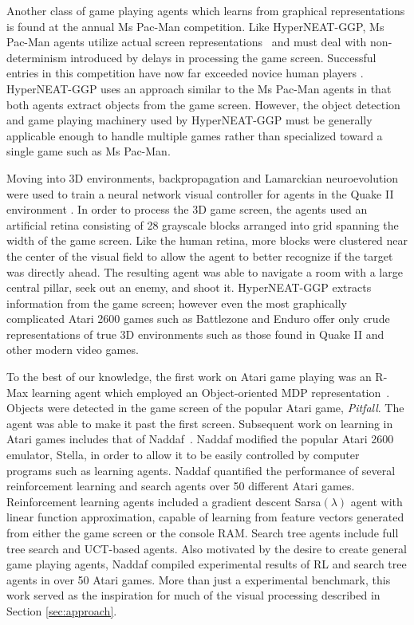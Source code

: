 \documentclass{sig-alternate}
\begin{document}
Another class of game playing agents which learns from graphical representations is found at the annual Ms Pac-Man competition. Like HyperNEAT-GGP, Ms Pac-Man agents utilize actual screen representations~\cite{pacmancompetition} and must deal with non-determinism introduced by delays in processing the game screen. Successful entries in this competition have now far exceeded novice human players \cite{sigevolution2007}. HyperNEAT-GGP uses an approach similar to the Ms Pac-Man agents in that both agents extract objects from the game screen. However, the object detection and game playing machinery used by HyperNEAT-GGP must be generally applicable enough to handle multiple games rather than specialized toward a single game such as Ms Pac-Man.

Moving into 3D environments, backpropagation and Lamarckian neuroevolution were used to train a neural network visual controller for agents in the Quake II environment \cite{parker09}. In order to process the 3D game screen, the agents used an artificial retina consisting of 28 grayscale blocks arranged into grid spanning the width of the game screen. Like the human retina, more blocks were clustered near the center of the visual field to allow the agent to better recognize if the target was directly ahead. The resulting agent was able to navigate a room with a large central pillar, seek out an enemy, and shoot it. HyperNEAT-GGP extracts information from the game screen; however even the most graphically complicated Atari 2600 games such as Battlezone and Enduro offer only crude representations of true 3D environments such as those found in Quake II and other modern video games. 

To the best of our knowledge, the first work on Atari game playing was an R-Max learning agent which employed an Object-oriented MDP representation~\cite{duik08}. Objects were detected in the game screen of the popular Atari game, \emph{Pitfall}. The agent was able to make it past the first screen. Subsequent work on learning in Atari games includes that of Naddaf~\cite{naddaf10}. Naddaf modified the popular Atari 2600 emulator, Stella, in order to allow it to be easily controlled by computer programs such as learning agents. Naddaf quantified the performance of several reinforcement learning and search agents over 50 different Atari games. Reinforcement learning agents included a gradient descent Sarsa$(\lambda)$ agent with linear function approximation, capable of learning from feature vectors generated from either the game screen or the console RAM. Search tree agents include full tree search and UCT-based agents. Also motivated by the desire to create general game playing agents, Naddaf compiled experimental results of RL and search tree agents in over 50 Atari games. More than just a experimental benchmark, this work served as the inspiration for much of the visual processing described in Section \ref{sec:approach}.
\end{document}
